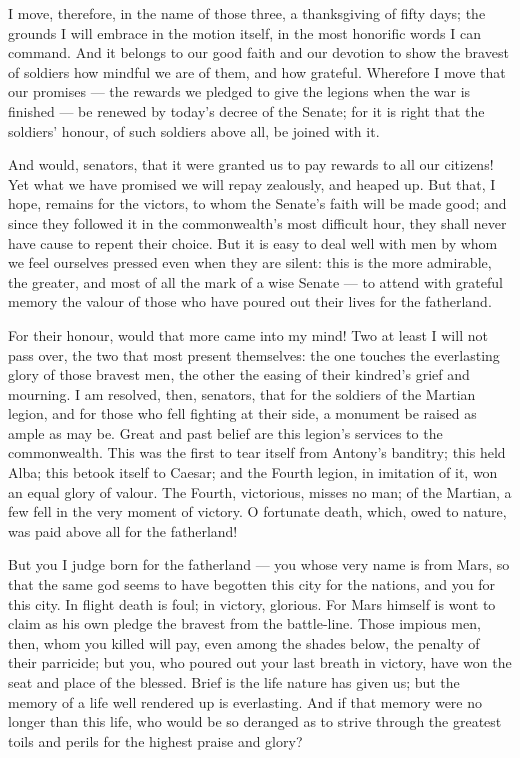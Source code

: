  I move, therefore, in the name of those three, a thanksgiving of fifty days; the grounds I will embrace in the motion itself, in the most honorific words I can command. And it belongs to our good faith and our devotion to show the bravest of soldiers how mindful we are of them, and how grateful. Wherefore I move that our promises --- the rewards we pledged to give the legions when the war is finished --- be renewed by today's decree of the Senate; for it is right that the soldiers' honour, of such soldiers above all, be joined with it.

 And would, senators, that it were granted us to pay rewards to all our citizens! Yet what we have promised we will repay zealously, and heaped up. But that, I hope, remains for the victors, to whom the Senate's faith will be made good; and since they followed it in the commonwealth's most difficult hour, they shall never have cause to repent their choice. But it is easy to deal well with men by whom we feel ourselves pressed even when they are silent: this is the more admirable, the greater, and most of all the mark of a wise Senate --- to attend with grateful memory the valour of those who have poured out their lives for the fatherland.

 For their honour, would that more came into my mind! Two at least I will not pass over, the two that most present themselves: the one touches the everlasting glory of those bravest men, the other the easing of their kindred's grief and mourning. I am resolved, then, senators, that for the soldiers of the Martian legion, and for those who fell fighting at their side, a monument be raised as ample as may be. Great and past belief are this legion's services to the commonwealth. This was the first to tear itself from Antony's banditry; this held Alba; this betook itself to Caesar; and the Fourth legion, in imitation of it, won an equal glory of valour. The Fourth, victorious, misses no man; of the Martian, a few fell in the very moment of victory. O fortunate death, which, owed to nature, was paid above all for the fatherland!

 But you I judge born for the fatherland --- you whose very name is from Mars, so that the same god seems to have begotten this city for the nations, and you for this city. In flight death is foul; in victory, glorious. For Mars himself is wont to claim as his own pledge the bravest from the battle-line. Those impious men, then, whom you killed will pay, even among the shades below, the penalty of their parricide; but you, who poured out your last breath in victory, have won the seat and place of the blessed. Brief is the life nature has given us; but the memory of a life well rendered up is everlasting. And if that memory were no longer than this life, who would be so deranged as to strive through the greatest toils and perils for the highest praise and glory?

